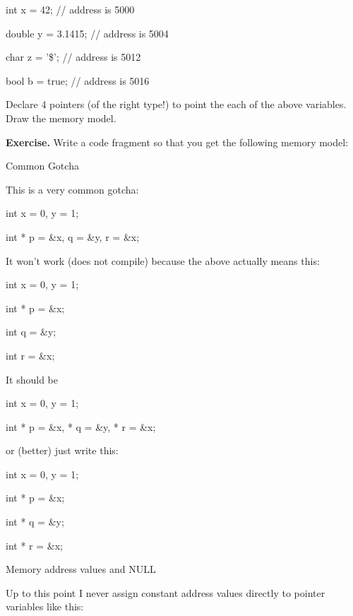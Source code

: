 \begin{ex}
\begin{consolethree}[escapeinside=||]

int x = 42; // address is 5000

double y = 3.1415; // address is 5004

char z = '\$'; // address is 5012

bool b = true; // address is 5016
\end{consolethree}
Declare 4 pointers (of the right type!) to point the each of the above
variables. Draw the memory model.

\textbf{Exercise.} Write a code fragment so that you get the following
memory model:

Common Gotcha

This is a very common gotcha:

\begin{consolethree}[escapeinside=||]

int x = 0, y = 1;

int * p = \&x, q = \&y, r = \&x;
\end{consolethree}
It won't work (does not compile) because the above actually means this:

\begin{consolethree}[escapeinside=||]

int x = 0, y = 1;

int * p = \&x;

int q = \&y;

int r = \&x;
\end{consolethree}
It should be

\begin{consolethree}[escapeinside=||]

int x = 0, y = 1;

int * p = \&x, * q = \&y, * r = \&x;
\end{consolethree}
or (better) just write this:

\begin{consolethree}[escapeinside=||]

int x = 0, y = 1;

int * p = \&x;

int * q = \&y;

int * r = \&x;
\end{consolethree}
Memory address values and NULL

Up to this point I never assign constant address values directly to
pointer variables like this:

\begin{consolethree}[escapeinside=||]


\end{consolethree}
\end{ex}
